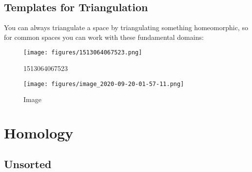 \hypertarget{templates-for-triangulation}{%
\subsection{Templates for
Triangulation}\label{templates-for-triangulation}}

You can always triangulate a space by triangulating something
homeomorphic, so for common spaces you can work with these fundamental
domains:

\begin{figure}
\centering
\texttt{[image: figures/1513064067523.png]}
\caption{1513064067523}
\end{figure}

\begin{figure}
\centering
\texttt{[image: figures/image\_2020-09-20-01-57-11.png]}
\caption{Image}
\end{figure}

\hypertarget{homology}{%
\section{Homology}\label{homology}}

\hypertarget{unsorted}{%
\subsection{Unsorted}\label{unsorted}}

